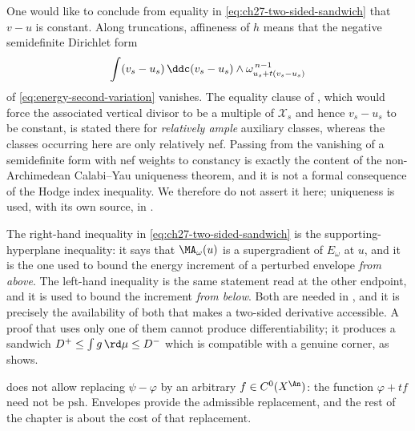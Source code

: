 \begin{remark}
\label{rem:ch27-equality-case}
One would like to conclude from equality in
\eqref{eq:ch27-two-sided-sandwich} that \(v-u\) is constant.  Along
truncations, affineness of \(h\) means that the negative semidefinite
Dirichlet form
\[
 \int(v_s-u_s)\,\ddc(v_s-u_s)\wedge\omega_{u_s+t(v_s-u_s)}^{\,n-1}
\]
of \eqref{eq:energy-second-variation} vanishes.  The equality clause of
, which would force the associated vertical
divisor to be a multiple of \(\mathcal X_s\) and hence \(v_s-u_s\) to be
constant, is stated there for \emph{relatively ample} auxiliary classes,
whereas the classes occurring here are only relatively nef.  Passing from
the vanishing of a semidefinite form with nef weights to constancy is
exactly the content of the non-Archimedean Calabi--Yau uniqueness theorem,
and it is not a formal consequence of the Hodge index inequality.  We
therefore do not assert it here; uniqueness is used, with its own source,
in .
\end{remark}

\begin{remark}
\label{rem:ch27-which-inequality}
The right-hand inequality in \eqref{eq:ch27-two-sided-sandwich} is the
supporting-hyperplane inequality: it says that
\(\MA_\omega(u)\) is a supergradient of \(E_\omega\) at \(u\), and it is the
one used to bound the energy increment of a perturbed envelope
\emph{from above}.  The left-hand inequality is the same statement read at
the other endpoint, and it is used to bound the increment \emph{from below}.
Both are needed in , and it
is precisely the availability of both that makes a two-sided derivative
accessible.  A proof that uses only one of them cannot produce
differentiability; it produces a sandwich
\(D^+\leq\int g\,\rd\mu\leq D^-\) which is compatible with a genuine corner,
as  shows.
\end{remark}

\begin{remark}
 does not allow replacing
\(\psi-\varphi\) by an arbitrary \(f\in C^0(X^{\An})\): the function
\(\varphi+tf\) need not be psh. Envelopes provide the admissible
replacement, and the rest of the chapter is about the cost of that
replacement.
\end{remark}

